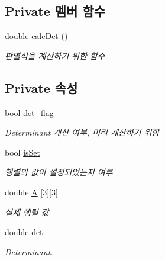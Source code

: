\subsection*{Private 멤버 함수}
\begin{DoxyCompactItemize}
\item 
double \hyperlink{class_m_a_t_r_i_x3_d_a81930ff56a1e199b2d3e606f27ed0a29}{calc\-Det} ()
\begin{DoxyCompactList}\small\item\em 판별식을 계산하기 위한 함수 \end{DoxyCompactList}\end{DoxyCompactItemize}
\subsection*{Private 속성}
\begin{DoxyCompactItemize}
\item 
bool \hyperlink{class_m_a_t_r_i_x3_d_ab951cbc695222c9cd96d1f2990b1a662}{det\-\_\-flag}
\begin{DoxyCompactList}\small\item\em Determinant 계산 여부, 미리 계산하기 위함 \end{DoxyCompactList}\item 
bool \hyperlink{class_m_a_t_r_i_x3_d_a3d3bd9c2ee0c213ca2f69804c3db6ac6}{is\-Set}
\begin{DoxyCompactList}\small\item\em 행렬의 값이 설정되었는지 여부 \end{DoxyCompactList}\item 
double \hyperlink{class_m_a_t_r_i_x3_d_ad46f057c72ed680b5d94f7b168908fc9}{A} \mbox{[}3\mbox{]}\mbox{[}3\mbox{]}
\begin{DoxyCompactList}\small\item\em 실제 행렬 값 \end{DoxyCompactList}\item 
double \hyperlink{class_m_a_t_r_i_x3_d_a836b104900b7c16a92bda6e41612a77d}{det}
\begin{DoxyCompactList}\small\item\em Determinant. \end{DoxyCompactList}\end{DoxyCompactItemize}


